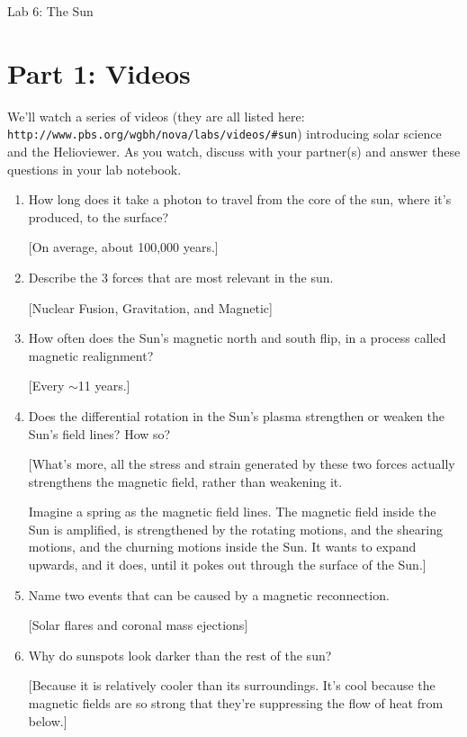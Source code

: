 \documentclass[11pt]{article}%
\begin{document}
\begin{center}
\huge Lab 6: The Sun
\end{center}
	

\section*{Part 1: Videos}
We'll watch a series of videos (they are all listed here: {\tt http://www.pbs.org/wgbh/nova/labs/videos/\#sun}) introducing solar science and the Helioviewer. As you watch, discuss with your partner(s) and answer these questions in your lab notebook. 
\begin{enumerate}
\item How long does it take a photon to travel from the core of the sun, where it's produced, to the surface?

[On average, about 100,000 years.]

\item Describe the 3 forces that are most relevant in the sun.

[Nuclear Fusion, Gravitation, and Magnetic]

\item How often does the Sun's magnetic north and south flip, in a process called magnetic realignment?

[Every $\sim$11 years.]

\item Does the differential rotation in the Sun's plasma strengthen or weaken the Sun's field lines? How so?

[What’s more, all the stress and strain generated by these two forces actually strengthens the magnetic field, rather than weakening it.

Imagine a spring as the magnetic field lines. The magnetic field inside the Sun is amplified, is strengthened by the rotating motions, and the shearing motions, and the churning motions inside the Sun. It wants to expand upwards, and it does, until it pokes out through the surface of the Sun.]


\item Name two events that can be caused by a magnetic reconnection.

[Solar flares and coronal mass ejections]

\item Why do sunspots look darker than the rest of the sun?

[Because it is relatively cooler than its surroundings. It’s cool because the magnetic fields are so strong that they’re suppressing the flow of heat from below.]


\end{enumerate}
\end{document}
